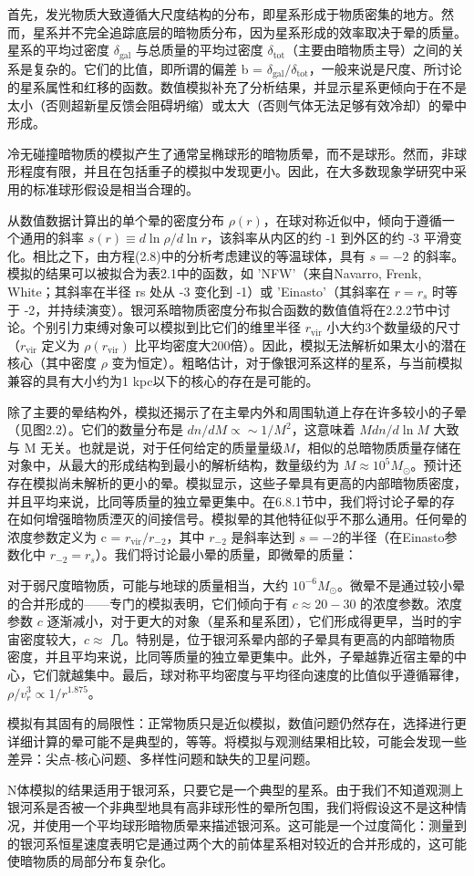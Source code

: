 首先，发光物质大致遵循大尺度结构的分布，即星系形成于物质密集的地方。然而，星系并不完全追踪底层的暗物质分布，因为星系形成的效率取决于晕的质量。星系的平均过密度 \( \delta_{\text{gal}} \) 与总质量的平均过密度 \( \delta_{\text{tot}} \)（主要由暗物质主导）之间的关系是复杂的。它们的比值，即所谓的偏差 b = \( \delta_{\text{gal}}/\delta_{\text{tot}} \)，一般来说是尺度、所讨论的星系属性和红移的函数。数值模拟补充了分析结果，并显示星系更倾向于在不是太小（否则超新星反馈会阻碍坍缩）或太大（否则气体无法足够有效冷却）的晕中形成。

冷无碰撞暗物质的模拟产生了通常呈椭球形的暗物质晕，而不是球形。然而，非球形程度有限，并且在包括重子的模拟中发现更小。因此，在大多数现象学研究中采用的标准球形假设是相当合理的。

从数值数据计算出的单个晕的密度分布 \( \rho(r) \)，在球对称近似中，倾向于遵循一个通用的斜率 \( s(r) \equiv d\ln\rho/d\ln r \)，该斜率从内区的约 -1 到外区的约 -3 平滑变化。相比之下，由方程(2.8)中的分析考虑建议的等温球体，具有 $s = -2$ 的斜率。模拟的结果可以被拟合为表2.1中的函数，如 'NFW'（来自Navarro, Frenk, White；其斜率在半径 rs 处从 -3 变化到 -1）或 'Einasto'（其斜率在 $r = r_s$ 时等于 -2，并持续演变）。银河系暗物质密度分布拟合函数的数值值将在2.2.2节中讨论。个别引力束缚对象可以模拟到比它们的维里半径 \( r_{\text{vir}} \) 小大约3个数量级的尺寸（\( r_{\text{vir}} \) 定义为 \( \rho(r_{\text{vir}}) \) 比平均密度大200倍）。因此，模拟无法解析如果太小的潜在核心（其中密度 \( \rho \) 变为恒定）。粗略估计，对于像银河系这样的星系，与当前模拟兼容的具有大小约为1 kpc以下的核心的存在是可能的。

除了主要的晕结构外，模拟还揭示了在主晕内外和周围轨道上存在许多较小的子晕（见图2.2）。它们的数量分布是 \( dn/dM \propto \sim 1/M^2 \)，这意味着 \( M dn/d\ln M \) 大致与 M 无关。也就是说，对于任何给定的质量量级$ M$，相似的总暗物质质量存储在对象中，从最大的形成结构到最小的解析结构，数量级约为 \( M \approx 10^5 M_\odot \)。预计还存在模拟尚未解析的更小的晕。模拟显示，这些子晕具有更高的内部暗物质密度，并且平均来说，比同等质量的独立晕更集中。在6.8.1节中，我们将讨论子晕的存在如何增强暗物质湮灭的间接信号。模拟晕的其他特征似乎不那么通用。任何晕的浓度参数定义为 c = \( r_{\text{vir}}/r_{-2} \)，其中 \( r_{-2} \) 是斜率达到 $s = -2 $的半径（在Einasto参数化中 \( r_{-2} = r_s \)）。我们将讨论最小晕的质量，即微晕的质量：

对于弱尺度暗物质，可能与地球的质量相当，大约 \(10^{-6} M_\odot\)。微晕不是通过较小晕的合并形成的——专门的模拟表明，它们倾向于有 \(c \approx 20 - 30\) 的浓度参数。浓度参数 \(c\) 逐渐减小，对于更大的对象（星系和星系团），它们形成得更早，当时的宇宙密度较大，\(c \approx\) 几。特别是，位于银河系晕内部的子晕具有更高的内部暗物质密度，并且平均来说，比同等质量的独立晕更集中。此外，子晕越靠近宿主晕的中心，它们就越集中。最后，球对称平均密度与平均径向速度的比值似乎遵循幂律，\(\rho/v^3_r \propto 1/r^{1.875}\)。

模拟有其固有的局限性：正常物质只是近似模拟，数值问题仍然存在，选择进行更详细计算的晕可能不是典型的，等等。将模拟与观测结果相比较，可能会发现一些差异：尖点-核心问题、多样性问题和缺失的卫星问题。

N体模拟的结果适用于银河系，只要它是一个典型的星系。由于我们不知道观测上银河系是否被一个非典型地具有高非球形性的晕所包围，我们将假设这不是这种情况，并使用一个平均球形暗物质晕来描述银河系。这可能是一个过度简化：测量到的银河系恒星速度表明它是通过两个大的前体星系相对较近的合并形成的，这可能使暗物质的局部分布复杂化。





 



